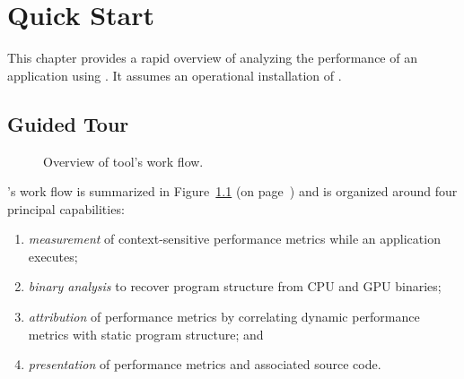 \documentclass[11pt,twoside,letterpaper]{report}
\begin{document}

\cleardoublepage
\chapter{Quick Start}
\label{chpt:quickstart}

This chapter provides a rapid overview of analyzing the performance of an application using \HPCToolkit{}.
It assumes an operational installation of \HPCToolkit{}.



\section{Guided Tour}
\label{chpt:quickstart:tour}

\begin{figure}[t]
\caption{Overview of \HPCToolkit{} tool's work flow.}
\label{fig:hpctoolkit-overview:b}
\end{figure}

\HPCToolkit{}'s work flow is summarized in Figure~\ref{fig:hpctoolkit-overview:b} (on page~\pageref{fig:hpctoolkit-overview:b}) and is organized around four principal capabilities:
\begin{enumerate}
  \item \emph{measurement} of context-sensitive performance metrics while an application executes;
  \item \emph{binary analysis} to recover program structure from CPU and GPU binaries;
  \item \emph{attribution} of performance metrics by correlating dynamic performance metrics with static program structure; and
  \item \emph{presentation} of performance metrics and associated source code.
\end{enumerate}
\end{document}
